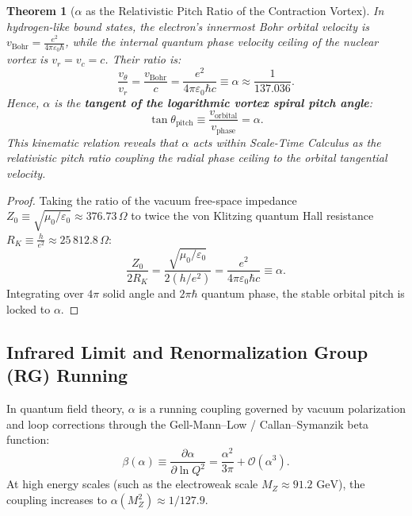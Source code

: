 \documentclass[11pt,a4paper]{article}
\newtheorem{theorem}{Theorem}[section]
\begin{document}
\begin{theorem}[$\alpha$ as the Relativistic Pitch Ratio of the Contraction Vortex]
    \label{thm:alpha_spiral_hatve_p2}
    In hydrogen-like bound states, the electron's innermost Bohr orbital velocity is $v_{\mathrm{Bohr}} = \frac{e^2}{4\pi \varepsilon_0 \hbar}$, while the internal quantum phase velocity ceiling of the nuclear vortex is $v_r = v_c = c$. Their ratio is:
    \begin{equation}
        \frac{v_\theta}{v_r} = \frac{v_{\mathrm{Bohr}}}{c} = \frac{e^2}{4\pi \varepsilon_0 \hbar c} \equiv \alpha \approx \frac{1}{137.036}.
        \label{eq:alpha_spiral_ispat}
    \end{equation}
    Hence, $\alpha$ is the \textbf{tangent of the logarithmic vortex spiral pitch angle}:
    \begin{equation}
        \tan \theta_{\mathrm{pitch}} \equiv \frac{v_{\mathrm{orbital}}}{v_{\mathrm{phase}}} = \alpha.
        \label{eq:hatve_tanim}
    \end{equation}
    This kinematic relation reveals that $\alpha$ acts within Scale-Time Calculus as the relativistic pitch ratio coupling the radial phase ceiling to the orbital tangential velocity.
\end{theorem}

\begin{proof}
    Taking the ratio of the vacuum free-space impedance $Z_0 \equiv \sqrt{\mu_0/\varepsilon_0} \approx 376.73\,\Omega$ to twice the von Klitzing quantum Hall resistance $R_K \equiv \frac{h}{e^2} \approx 25\,812.8\,\Omega$:
    \begin{equation}
        \frac{Z_0}{2 R_K} = \frac{\sqrt{\mu_0/\varepsilon_0}}{2 (h/e^2)} = \frac{e^2}{4\pi \varepsilon_0 \hbar c} \equiv \alpha.
    \end{equation}
    Integrating over $4\pi$ solid angle and $2\pi\hbar$ quantum phase, the stable orbital pitch is locked to $\alpha$.
\end{proof}

\subsection{Infrared Limit and Renormalization Group (RG) Running}
\label{sec:ab_initio_alpha}

In quantum field theory, $\alpha$ is a running coupling governed by vacuum polarization and loop corrections through the Gell-Mann--Low / Callan--Symanzik beta function:
\begin{equation}
    \beta(\alpha) \equiv \frac{\partial \alpha}{\partial \ln Q^2} = \frac{\alpha^2}{3\pi} + \mathcal{O}(\alpha^3).
    \label{eq:gell_mann_low}
\end{equation}
At high energy scales (such as the electroweak scale $M_Z \approx 91.2\text{ GeV}$), the coupling increases to $\alpha(M_Z^2) \approx 1/127.9$.
\end{document}
